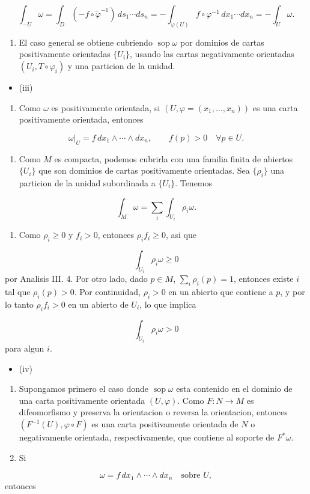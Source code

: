 \begin{bookproof}{}
\[
\int_{-U}\omega=\int_D(-f\circ\widetilde\varphi^{-1})\,ds_1\cdots ds_n =-\int_{\varphi(U)}f\circ\varphi^{-1}\,dx_1\cdots dx_n=-\int_U\omega.
\]
\begin{enumerate}[start=3]
\item El caso general se obtiene cubriendo $\operatorname{sop}\omega$ por dominios de cartas positivamente orientadas $\{U_i\}$, usando las cartas negativamente orientadas $(U_i,T\circ\varphi_i)$ y una particion de la unidad.
\end{enumerate}
\begin{itemize}
\item (iii)
\end{itemize}
\begin{enumerate}
\item Como $\omega$ es positivamente orientada, si $(U,\varphi=(x_1,\ldots,x_n))$ es una carta positivamente orientada, entonces
\end{enumerate}
\[
\omega|_U=f\,dx_1\wedge\cdots\wedge dx_n,\qquad f(p)>0\quad\forall p\in U.
\]
\begin{enumerate}[start=2]
\item Como $M$ es compacta, podemos cubrirla con una familia finita de abiertos $\{U_i\}$ que son dominios de cartas positivamente orientadas. Sea $\{\rho_i\}$ una particion de la unidad subordinada a $\{U_i\}$. Tenemos
\end{enumerate}
\[
\int_M\omega=\sum_i\int_{U_i}\rho_i\omega.
\]
\begin{enumerate}[start=3]
\item Como $\rho_i\ge0$ y $f_i>0$, entonces $\rho_if_i\ge0$, asi que
\end{enumerate}
\[
\int_{U_i}\rho_i\omega\ge0
\]
por Analisis III. 4. Por otro lado, dado $p\in M$, $\sum_i\rho_i(p)=1$, entonces existe $i$ tal que $\rho_i(p)>0$. Por continuidad, $\rho_i>0$ en un abierto que contiene a $p$, y por lo tanto $\rho_if_i>0$ en un abierto de $U_i$, lo que implica

\[
\int_{U_i}\rho_i\omega>0
\]
para algun $i$.

\begin{itemize}
\item (iv)
\end{itemize}
\begin{enumerate}
\item Supongamos primero el caso donde $\operatorname{sop}\omega$ esta contenido en el dominio de una carta positivamente orientada $(U,\varphi)$. Como $F:N\to M$ es difeomorfismo y preserva la orientacion o reversa la orientacion, entonces $(F^{-1}(U),\varphi\circ F)$ es una carta positivamente orientada de $N$ o negativamente orientada, respectivamente, que contiene al soporte de $F^*\omega$.
\item Si
\end{enumerate}
\[
\omega=f\,dx_1\wedge\cdots\wedge dx_n\quad\text{sobre }U,
\]
entonces


\end{bookproof}
